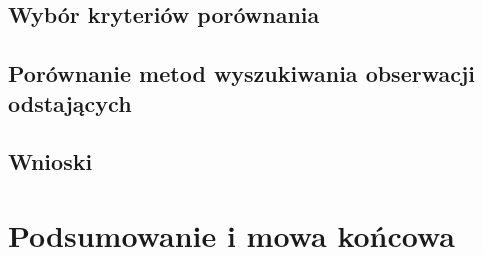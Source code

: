 \documentclass[eng,printmode]{mgr}
\begin{document}
\section{Wybór kryteriów porównania}
\section{Porównanie metod wyszukiwania obserwacji odstających}
\section{Wnioski}
\chapter{Podsumowanie i mowa końcowa}



\end{document}
